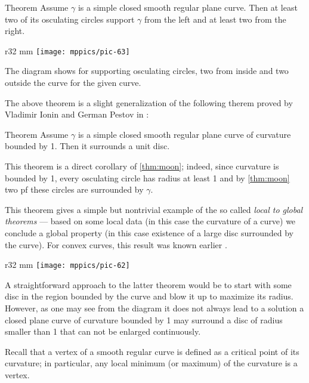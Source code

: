 \begin{thm}{Theorem}\label{thm:moon}
Assume $\gamma$ is a simple closed smooth regular plane curve.
Then at least two of its osculating circles support $\gamma$ from the left and  at least two from the right.
\end{thm}

\begin{wrapfigure}{r}{32 mm}
\vskip-0mm
\centering
\texttt{[image: mppics/pic-63]}
\vskip0mm
\end{wrapfigure}

The diagram shows for supporting osculating circles, two from inside and two outside the curve for the given curve.

The above theorem is a slight generalization of the following therem proved by Vladimir Ionin and German Pestov in \cite{pestov-ionin}:

\begin{thm}{Theorem}\label{thm:moon-orginal}
Assume $\gamma$ is a simple closed smooth regular plane curve of curvature bounded by 1.
Then it surrounds a unit disc.
\end{thm}

This theorem is a direct corollary of \ref{thm:moon};
indeed, since curvature is bounded by 1, every osculating circle has radius at least 1 and by \ref{thm:moon} two pf these circles are surrounded by $\gamma$.

This theorem gives a simple but nontrivial example of the so called \emph{local to global theorems} --- based on some local data (in this case the curvature of a curve) we conclude a global property (in this case existence of a large disc surrounded by the curve).
For convex curves, this result was known earlier \cite[\S 24]{blaschke}.

\begin{wrapfigure}{r}{32 mm}
\vskip-0mm
\centering
\texttt{[image: mppics/pic-62]}
\vskip0mm
\end{wrapfigure}

A straightforward approach to the latter theorem would be to start with some disc in the region bounded by the curve and blow it up to maximize its radius.
However, as one may see from the diagram it does not always lead to a solution a closed plane curve of curvature bounded by 1 may surround a disc of radius smaller than 1 that can not be enlarged continuously.  

Recall that a vertex of a smooth regular curve is defined as a critical point of its curvature;
in particular, any local minimum (or maximum) of the curvature is a vertex.

